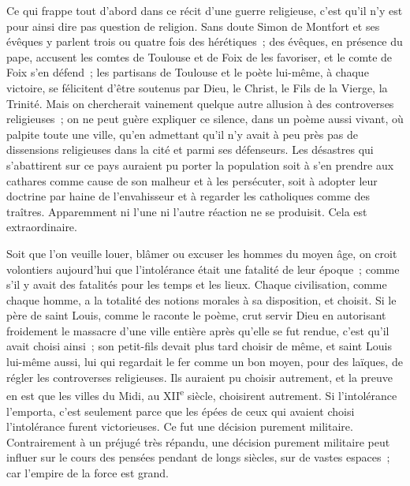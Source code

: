 \documentclass[french,twoside]{book} %
\begin{document}
Ce qui frappe tout d'abord dans ce récit d'une guerre religieuse, c'est qu'il n'y est pour ainsi dire pas question de religion. Sans doute Simon de Montfort et ses évêques y parlent trois ou quatre fois des hérétiques ; des évêques, en présence du pape, accusent les comtes de Toulouse et de Foix de les favoriser, et le comte de Foix s'en défend ; les partisans de Toulouse et le poète lui-même, à chaque victoire, se félicitent d'être soutenus par Dieu, le Christ, le Fils de la Vierge, la Trinité. Mais on chercherait vainement quelque autre allusion à des controverses religieuses ; on ne peut guère expliquer ce silence, dans un poème aussi vivant, où palpite toute une ville, qu'en admettant qu'il n'y avait à peu près pas de dissensions religieuses dans la cité et parmi ses défenseurs. Les désastres qui s'abattirent sur ce pays auraient pu porter la population soit à s'en prendre aux cathares comme cause de son malheur et à les persécuter, soit à adopter leur doctrine par haine de l'envahisseur et à regarder les catholiques comme des traîtres. Apparemment ni l'une ni l'autre réaction ne se produisit. Cela est extraordinaire.\par
Soit que l'on veuille louer, blâmer ou excuser les hommes du moyen âge, on croit volontiers aujourd'hui que l'intolérance était une fatalité de leur époque ; comme s'il y avait des fatalités pour les temps et les lieux. Chaque civilisation, comme chaque homme, a la totalité des notions morales à sa disposition, et choisit. Si le père de saint Louis, comme le raconte le poème, crut servir Dieu en autorisant froidement le massacre d'une ville entière après qu'elle se fut rendue, c'est qu'il avait choisi ainsi ; son petit-fils devait plus tard choisir de même, et saint Louis lui-même aussi, lui qui regardait le fer comme un bon moyen, pour des laïques, de régler les controverses religieuses. Ils auraient pu choisir autrement, et la preuve en est que les villes du Midi, au XII\textsuperscript{e} siècle, choisirent autrement. Si l'intolérance l'emporta, c'est seulement parce que les épées de ceux qui avaient choisi l'intolérance furent victorieuses. Ce fut une décision purement militaire. Contrairement à un préjugé très répandu, une décision purement militaire peut influer sur le cours des pensées pendant de longs siècles, sur de vastes espaces ; car l'empire de la force est grand.\par
\par
\end{document}

